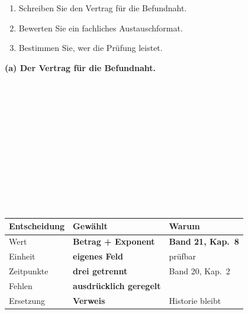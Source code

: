 \begin{aufgabe}
\begin{enumerate}[label=(\alph*)]
\item Schreiben Sie den Vertrag für die Befundnaht.
\item Bewerten Sie ein fachliches Austauschformat.
\item Bestimmen Sie, wer die Prüfung leistet.
\end{enumerate}

\loesung
\textbf{(a) Der Vertrag für die Befundnaht.}

\begin{center}
\begin{minipage}{0.92\textwidth}
\\
\\
\\
\\
\\
\\
\\
\\
\\
\\
\\
\end{minipage}
\end{center}

\begin{center}
{\small
\renewcommand{\arraystretch}{1.45}
\begin{tabular}{@{}P{3.0cm}P{2.4cm}P{2.6cm}@{}}
\toprule
\textbf{Entscheidung} & \textbf{Gewählt} & \textbf{Warum}\\
\midrule
Wert & \textbf{Betrag + Exponent} & \textcolor{gruen}{\textbf{Band 21, Kap.~8}}\\
Einheit & \textbf{eigenes Feld} & \textcolor{gruen}{prüfbar}\\
Zeitpunkte & \textbf{drei getrennt} & \textcolor{gruen}{Band 20, Kap.~2}\\
Fehlen & \textbf{ausdrücklich geregelt} & \\
Ersetzung & \textbf{Verweis} & \textcolor{gruen}{Historie bleibt}\\
\bottomrule
\end{tabular}}
\end{center}


\end{aufgabe}
